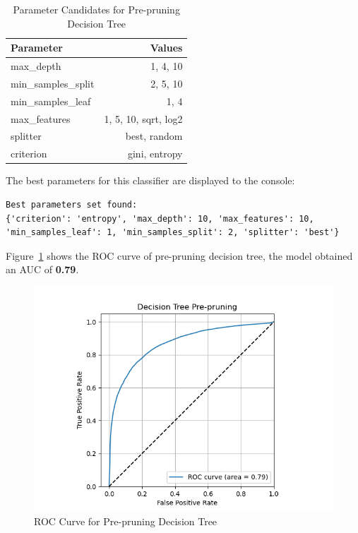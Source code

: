 \begin{table}[h]
\centering
\begin{tabular}{|l|r|}
\hline
\textbf{Parameter}         & \textbf{Values}                   \\ \hline
max\_depth         & 1, 4, 10                          \\ \hline
min\_samples\_split & 2, 5, 10                          \\ \hline
min\_samples\_leaf  & 1, 4                              \\ \hline
max\_features      & 1, 5, 10, sqrt, log2              \\ \hline
splitter           & best, random                      \\ \hline
criterion          & gini, entropy                     \\ \hline
\end{tabular}
\caption{Parameter Candidates for Pre-pruning Decision Tree}
\label{tab:parameters-pre-dt}
\end{table}

The best parameters for this classifier are displayed to the console:

\begin{verbatim}
Best parameters set found:
{'criterion': 'entropy', 'max_depth': 10, 'max_features': 10,
'min_samples_leaf': 1, 'min_samples_split': 2, 'splitter': 'best'}
\end{verbatim}

Figure~\ref{fig:roc-dt-pre} shows the ROC curve of pre-pruning decision tree, the model obtained an AUC of \textbf{0.79}.

\begin{figure}
    \centering
    \includegraphics[width=1\linewidth]{docs//assets/individual_roc_curve_Decision Tree Pre-pruning.png}
    \caption{ROC Curve for Pre-pruning Decision Tree}
    \label{fig:roc-dt-pre}
\end{figure}

